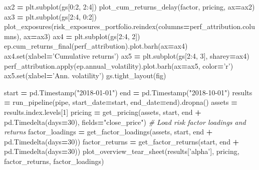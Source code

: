 \documentclass[11,]{article}
\newenvironment{Shaded}{\begin{snugshade}}{\end{snugshade}}
\newcommand{\BuiltInTok}[1]{#1}
\newcommand{\CommentTok}[1]{\textcolor[rgb]{0.56,0.35,0.01}{\textit{#1}}}
\newcommand{\DecValTok}[1]{\textcolor[rgb]{0.00,0.00,0.81}{#1}}
\newcommand{\NormalTok}[1]{#1}
\newcommand{\OperatorTok}[1]{\textcolor[rgb]{0.81,0.36,0.00}{\textbf{#1}}}
\newcommand{\StringTok}[1]{\textcolor[rgb]{0.31,0.60,0.02}{#1}}
\begin{document}
\begin{Shaded}
\begin{Highlighting}[]
\NormalTok{    ax2 }\OperatorTok{=}\NormalTok{ plt.subplot(gs[}\DecValTok{0}\NormalTok{:}\DecValTok{2}\NormalTok{, }\DecValTok{2}\NormalTok{:}\DecValTok{4}\NormalTok{])}
\NormalTok{    plot_cum_returns_delay(factor, pricing, ax}\OperatorTok{=}\NormalTok{ax2)}
\NormalTok{    ax3 }\OperatorTok{=}\NormalTok{ plt.subplot(gs[}\DecValTok{2}\NormalTok{:}\DecValTok{4}\NormalTok{, }\DecValTok{0}\NormalTok{:}\DecValTok{2}\NormalTok{])}
\NormalTok{    plot_exposures(risk_exposures_portfolio.reindex(columns}\OperatorTok{=}\NormalTok{perf_attribution.columns), }
\NormalTok{                   ax}\OperatorTok{=}\NormalTok{ax3)}
\NormalTok{    ax4 }\OperatorTok{=}\NormalTok{ plt.subplot(gs[}\DecValTok{2}\NormalTok{:}\DecValTok{4}\NormalTok{, }\DecValTok{2}\NormalTok{])}
\NormalTok{    ep.cum_returns_final(perf_attribution).plot.barh(ax}\OperatorTok{=}\NormalTok{ax4)}
\NormalTok{    ax4.}\BuiltInTok{set}\NormalTok{(xlabel}\OperatorTok{=}\StringTok{'Cumulative returns'}\NormalTok{)}
\NormalTok{    ax5 }\OperatorTok{=}\NormalTok{ plt.subplot(gs[}\DecValTok{2}\NormalTok{:}\DecValTok{4}\NormalTok{, }\DecValTok{3}\NormalTok{], sharey}\OperatorTok{=}\NormalTok{ax4)}
\NormalTok{    perf_attribution.}\BuiltInTok{apply}\NormalTok{(ep.annual_volatility).plot.barh(ax}\OperatorTok{=}\NormalTok{ax5, color}\OperatorTok{=}\StringTok{'r'}\NormalTok{)}
\NormalTok{    ax5.}\BuiltInTok{set}\NormalTok{(xlabel}\OperatorTok{=}\StringTok{'Ann. volatility'}\NormalTok{)}
\NormalTok{    gs.tight_layout(fig)}
    
\NormalTok{start }\OperatorTok{=}\NormalTok{ pd.Timestamp(}\StringTok{"2018-01-01"}\NormalTok{)}
\NormalTok{end }\OperatorTok{=}\NormalTok{ pd.Timestamp(}\StringTok{"2018-10-01"}\NormalTok{)}
\NormalTok{results }\OperatorTok{=}\NormalTok{ run_pipeline(pipe, start_date}\OperatorTok{=}\NormalTok{start, end_date}\OperatorTok{=}\NormalTok{end).dropna()}
\NormalTok{assets }\OperatorTok{=}\NormalTok{ results.index.levels[}\DecValTok{1}\NormalTok{]}
\NormalTok{pricing }\OperatorTok{=}\NormalTok{ get_pricing(assets, start, end }\OperatorTok{+}\NormalTok{ pd.Timedelta(days}\OperatorTok{=}\DecValTok{30}\NormalTok{), fields}\OperatorTok{=}\StringTok{"close_price"}\NormalTok{)}
\CommentTok{# Load risk factor loadings and returns}
\NormalTok{factor_loadings }\OperatorTok{=}\NormalTok{ get_factor_loadings(assets, start, end }\OperatorTok{+}\NormalTok{ pd.Timedelta(days}\OperatorTok{=}\DecValTok{30}\NormalTok{))}
\NormalTok{factor_returns }\OperatorTok{=}\NormalTok{ get_factor_returns(start, end }\OperatorTok{+}\NormalTok{ pd.Timedelta(days}\OperatorTok{=}\DecValTok{30}\NormalTok{))}
\NormalTok{plot_overview_tear_sheet(results[}\StringTok{'alpha'}\NormalTok{], pricing, factor_returns, factor_loadings)}
\end{Highlighting}
\end{Shaded}
\end{document}
